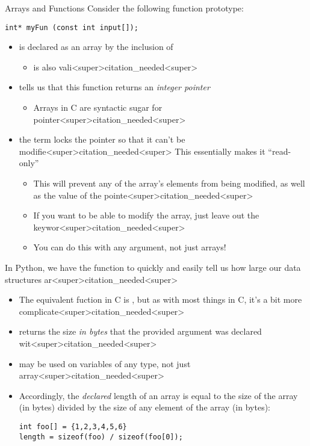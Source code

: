 \documentclass[11pt]{beamer}
\let\OldTexttt\texttt
\renewcommand{\texttt}[1]{\OldTexttt{\color{teal}{#1}}}
\begin{document}
\begin{frame}[fragile=singleslide]{Arrays and Functions}
Consider the following function prototype:
\begin{lstlisting}[style=C]
int* myFun (const int input[]);
\end{lstlisting}
\begin{itemize}
\item \texttt{input} is declared as an array by the inclusion of \texttt{[]}
\begin{itemize}
\item \texttt{int*} is also vali<super>citation_needed<super>
\end{itemize}
\item \texttt{int*} tells us that this function returns an \textit{integer pointer}
\begin{itemize}
\item Arrays in C are syntactic sugar for pointer<super>citation_needed<super>
\end{itemize}
\item the \texttt{const} term locks the pointer so that it can't be modifie<super>citation_needed<super>  This essentially makes it ``read-only''
\begin{itemize}
\item This will prevent any of the array's elements from being modified, as well as the value of the pointe<super>citation_needed<super>  
\item If you want to be able to modify the array, just leave out the \texttt{const} keywor<super>citation_needed<super>
\item You can do this with any argument, not just arrays!
\end{itemize}
\end{itemize}
\end{frame}

\begin{frame}[fragile=singleslide]{\texttt{sizeof}}
In Python, we have the \texttt{len()} function to quickly and easily tell us how large our data structures ar<super>citation_needed<super>  
\begin{itemize}
\item The equivalent fuction in C is \texttt{sizeof()}, but as with most things in C, it's a bit more complicate<super>citation_needed<super>
\item \texttt{sizeof()} returns the size \emph{in bytes} that the provided argument was declared wit<super>citation_needed<super>   
\item \texttt{sizeof()} may be used on variables of any type, not just array<super>citation_needed<super>
\item Accordingly, the \emph{declared} length of an array is equal to the size of the array (in bytes) divided by the size of any element of the array (in bytes):
\begin{lstlisting}[style=C]
int foo[] = {1,2,3,4,5,6}
length = sizeof(foo) / sizeof(foo[0]);
\end{lstlisting}
\end{itemize}
\end{frame}
\end{document}
